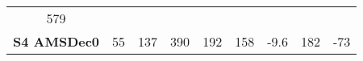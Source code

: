 \begin{longtable}[]{@{}crrrrrrrr@{}}
\begin{minipage}[t]{0.14\columnwidth}
579\strut
\end{minipage}\tabularnewline
\begin{minipage}[t]{0.09\columnwidth}\centering\strut
\textbf{S4 AMSDec0}\strut
\end{minipage} & \begin{minipage}[t]{0.09\columnwidth}\raggedleft\strut
55\strut
\end{minipage} & \begin{minipage}[t]{0.07\columnwidth}\raggedleft\strut
137\strut
\end{minipage} & \begin{minipage}[t]{0.06\columnwidth}\raggedleft\strut
390\strut
\end{minipage} & \begin{minipage}[t]{0.08\columnwidth}\raggedleft\strut
192\strut
\end{minipage} & \begin{minipage}[t]{0.08\columnwidth}\raggedleft\strut
158\strut
\end{minipage} & \begin{minipage}[t]{0.04\columnwidth}\raggedleft\strut
-9.6\strut
\end{minipage} & \begin{minipage}[t]{0.14\columnwidth}\raggedleft\strut
182\strut
\end{minipage} & \begin{minipage}[t]{0.14\columnwidth}\raggedleft\strut
-73\strut
\end{minipage}\tabularnewline
\bottomrule
\end{longtable}
